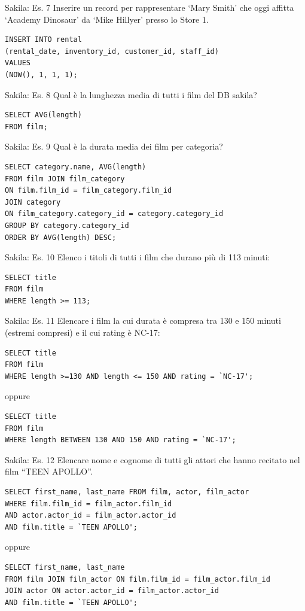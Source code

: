 \begin{frame}[fragile]{Sakila: Es. 7}
Inserire un record per rappresentare `Mary Smith' che oggi affitta `Academy Dinosaur' da `Mike Hillyer' presso lo Store 1.
\begin{lstlisting}
INSERT INTO rental
(rental_date, inventory_id, customer_id, staff_id)
VALUES
(NOW(), 1, 1, 1);
\end{lstlisting}
\end{frame}

%
\begin{frame}[fragile]{Sakila: Es. 8}
Qual \`e la lunghezza media di tutti i film del DB sakila?
\pause
\begin{lstlisting}
SELECT AVG(length)
FROM film;
\end{lstlisting}
\end{frame}
%
\begin{frame}[fragile]{Sakila: Es. 9}
Qual \`e la durata media dei film per categoria?
\pause
\begin{lstlisting}
SELECT category.name, AVG(length)
FROM film JOIN film_category
ON film.film_id = film_category.film_id
JOIN category
ON film_category.category_id = category.category_id
GROUP BY category.category_id
ORDER BY AVG(length) DESC;
\end{lstlisting}
\end{frame}
%
\begin{frame}[fragile]{Sakila: Es. 10}
Elenco i titoli di tutti i film che durano pi\`u di 113 minuti:
\pause
\begin{lstlisting}
SELECT title
FROM film
WHERE length >= 113;
\end{lstlisting}
\end{frame}
%
\begin{frame}[fragile]{Sakila: Es. 11}
Elencare i film la cui durata \`e compresa tra 130 e 150 minuti (estremi compresi) e il cui rating \`e NC-17:
\pause
\begin{lstlisting}
SELECT title
FROM film
WHERE length >=130 AND length <= 150 AND rating = `NC-17';
\end{lstlisting}
\pause
oppure
\begin{lstlisting}
SELECT title
FROM film
WHERE length BETWEEN 130 AND 150 AND rating = `NC-17';
\end{lstlisting}
\end{frame}
%
\begin{frame}[fragile]{Sakila: Es. 12}
Elencare nome e cognome di tutti gli attori che hanno recitato nel film ``TEEN APOLLO''.
\pause
\begin{lstlisting}
SELECT first_name, last_name FROM film, actor, film_actor
WHERE film.film_id = film_actor.film_id
AND actor.actor_id = film_actor.actor_id
AND film.title = `TEEN APOLLO';
\end{lstlisting}
\pause
oppure
\begin{lstlisting}
SELECT first_name, last_name
FROM film JOIN film_actor ON film.film_id = film_actor.film_id
JOIN actor ON actor.actor_id = film_actor.actor_id
AND film.title = `TEEN APOLLO';
\end{lstlisting}
\end{frame}
